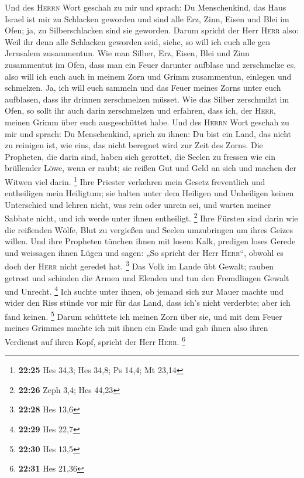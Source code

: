  Und des \textsc{Herrn} Wort geschah zu mir und sprach:
 Du Menschenkind, das Haus Israel ist mir zu Schlacken
geworden und sind alle Erz, Zinn, Eisen und Blei im Ofen; ja, zu
Silberschlacken sind sie geworden.  Darum spricht der
Herr \textsc{Herr} also: Weil ihr denn alle Schlacken geworden seid,
siehe, so will ich euch alle gen Jerusalem zusammentun. 
Wie man Silber, Erz, Eisen, Blei und Zinn zusammentut im Ofen, dass man
ein Feuer darunter aufblase und zerschmelze es, also will ich euch auch
in meinem Zorn und Grimm zusammentun, einlegen und schmelzen.
 Ja, ich will euch sammeln und das Feuer meines Zorns
unter euch aufblasen, dass ihr drinnen zerschmelzen müsset.
 Wie das Silber zerschmilzt im Ofen, so sollt ihr auch
darin zerschmelzen und erfahren, dass ich, der \textsc{Herr}, meinen
Grimm über euch ausgeschüttet habe.  Und des
\textsc{Herrn} Wort geschah zu mir und sprach:  Du
Menschenkind, sprich zu ihnen: Du bist ein Land, das nicht zu reinigen
ist, wie eins, das nicht beregnet wird zur Zeit des Zorns.
 Die Propheten, die darin sind, haben sich gerottet, die
Seelen zu fressen wie ein brüllender Löwe, wenn er raubt; sie reißen Gut
und Geld an sich und machen der Witwen viel darin. \footnote{\textbf{22:25}
  Hes 34,3; Hes 34,8; Ps 14,4; Mt 23,14}  Ihre Priester
verkehren mein Gesetz freventlich und entheiligen mein Heiligtum; sie
halten unter dem Heiligen und Unheiligen keinen Unterschied und lehren
nicht, was rein oder unrein sei, und warten meiner Sabbate nicht, und
ich werde unter ihnen entheiligt. \footnote{\textbf{22:26} Zeph 3,4; Hes
  44,23}  Ihre Fürsten sind darin wie die reißenden
Wölfe, Blut zu vergießen und Seelen umzubringen um ihres Geizes willen.
 Und ihre Propheten tünchen ihnen mit losem Kalk,
predigen loses Gerede und weissagen ihnen Lügen und sagen: „So spricht
der Herr \textsc{Herr}``, obwohl es doch der \textsc{Herr} nicht geredet
hat. \footnote{\textbf{22:28} Hes 13,6}  Das Volk im
Lande übt Gewalt; rauben getrost und schinden die Armen und Elenden und
tun den Fremdlingen Gewalt und Unrecht. \footnote{\textbf{22:29} Hes
  22,7}  Ich suchte unter ihnen, ob jemand sich zur Mauer
machte und wider den Riss stünde vor mir für das Land, dass ich's nicht
verderbte; aber ich fand keinen. \footnote{\textbf{22:30} Hes 13,5}
 Darum schüttete ich meinen Zorn über sie, und mit dem
Feuer meines Grimmes machte ich mit ihnen ein Ende und gab ihnen also
ihren Verdienst auf ihren Kopf, spricht der Herr \textsc{Herr}.
\footnote{\textbf{22:31} Hes 21,36}

